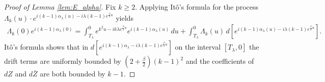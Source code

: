 \documentclass[12pt]{article}
\theoremstyle{definition} %
\theoremstyle{remark} %
\begin{document}
\begin{proof}[Proof of Lemma \ref{lem:E_alpha}]
Fix  $k\ge 2$.  Applying Itô’s formula for the process $\Lambda_k(u) \cdot  e^{i (k-1)\alpha_\lambda(u)-i \lambda (k-1)e^{\frac{\beta}{4}u}}$ yields
\begin{align}\label{eq:stoch_part_int}
  \Lambda_k(0)   e^{i (k-1)\alpha_\lambda(0)}=\int_{T_\lambda}^0  e^{k^2 u - i k \lambda e^{\frac{\beta}{4}u}} e^{i (k-1)\alpha_\lambda(u)}\, du+\int_{T_\lambda}^0 \Lambda_k(u) \,d\!\left[e^{i (k-1)\alpha_\lambda(u)-i \lambda (k-1)e^{\frac{\beta}{4}u}}\right]. 
\end{align}
It\^o's formula shows that in $d[e^{i (k-1) \alpha_\lambda - i \lambda (k-1) e^{\frac{\beta}{4}u}}]$ on the interval $[T_\lambda,0]$ the drift terms are uniformly bounded by $(2+\tfrac{\beta}{2})(k-1)^2$ and the coefficients of $dZ$ and $d\bar Z$ are both bounded by  $k-1$.

\end{proof}
\end{document}
